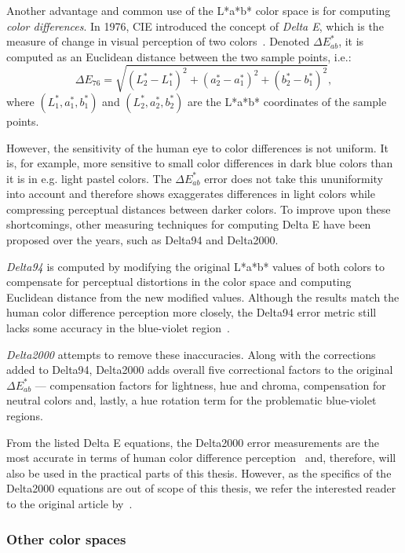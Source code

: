 Another advantage and common use of the L*a*b* color space is for computing \emph{color differences}. In 1976, CIE introduced the concept of \emph{Delta E}, which is the measure of change in visual perception of two colors~\cite{deltaEOverview}. Denoted $\Delta E_{ab}^*$, it is computed as an Euclidean distance between the two sample points, i.e.:
\begin{equation} \label{deltaE}
\Delta E_{76}=\sqrt{(L_{2}^* - L_{1}^*)^2 + (a_{2}^* - a_{1}^*)^2 + (b_{2}^* - b_{1}^*)^2},
\end{equation}
where $(L_{1}^*,a_{1}^*,b_{1}^*)$  and $(L_{2}^*,a_{2}^*,b_{2}^*)$ are the L*a*b* coordinates of the sample points.

However, the sensitivity of the human eye to color differences is not uniform. It is, for example, more sensitive to small color differences in dark blue colors than it is in e.g. light pastel colors. The $\Delta E_{ab}^*$ error does not take this ununiformity into account and therefore shows exaggerates differences in light colors while compressing perceptual distances between darker colors. To improve upon these shortcomings, other measuring techniques for computing Delta E have been proposed over the years, such as Delta94 and Delta2000.

\emph{Delta94} is computed by modifying the original L*a*b* values of both colors to compensate for perceptual distortions in the color space and computing Euclidean distance from the new modified values. Although the results match the human color difference perception more closely, the Delta94 error metric still lacks some accuracy in the blue-violet region~\cite{deltaEOverview}.
	
\emph{Delta2000} attempts to remove these inaccuracies. Along with the corrections added to Delta94, Delta2000 adds overall five correctional factors to the original $\Delta E_{ab}^*$ --- compensation factors for lightness, hue and chroma, compensation for neutral colors and, lastly, a hue rotation term for the problematic blue-violet regions. 

From the listed Delta E equations, the Delta2000 error measurements are the most accurate in terms of human color difference perception~\cite{deltaEOverview} and, therefore, will also be used in the practical parts of this thesis. However, as the specifics of the Delta2000 equations are out of scope of this thesis, we refer the interested reader to the original article by~\citet{delta2000}.

\subsubsection{Other color spaces}

